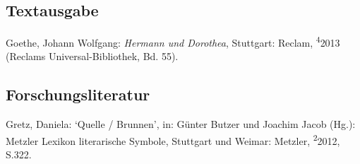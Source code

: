 \subsection*{Textausgabe}
\begin{hangparas}{.5in}{1}
	Goethe, Johann Wolfgang: \textit{Hermann und Dorothea},
		Stuttgart: Reclam,
		\textsuperscript{4}2013 (Reclams Universal-Bibliothek, Bd. 55).
\end{hangparas}

\subsection*{Forschungsliteratur}

\begin{hangparas}{.5in}{1}
Gretz, Daniela: \enquote*{Quelle / Brunnen},
	in: Günter Butzer und Joachim Jacob (Hg.):  Metzler Lexikon literarische Symbole,
	Stuttgart und Weimar: Metzler, \textsuperscript{2}2012, S.322.
\end{hangparas}